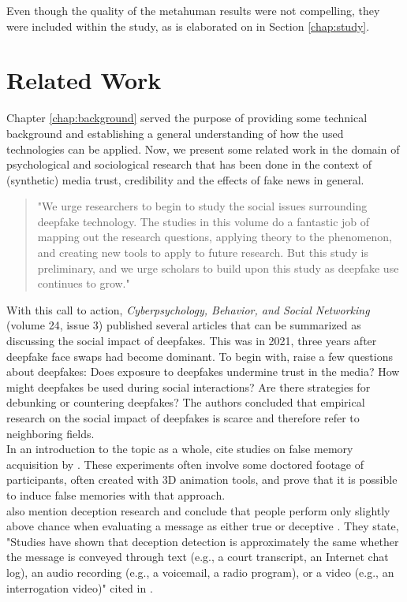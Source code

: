 \documentclass[
  a4paper,  %
  twoside,  %
  bibliography=totoc,
  headsepline,
  cleardoublepage=empty,
  parskip=half,
  draft=false
]{scrbook}
\begin{document}
Even though the quality of the metahuman results were not compelling, they were included  within the study, as is elaborated on in Section \ref{chap:study}. 

\chapter{Related Work}
\label{chap:rel-work}
Chapter \ref{chap:background} served the purpose of providing some technical background and establishing a general understanding of how the used technologies can be applied. Now, we present some related work in the domain of psychological and sociological research that has been done in the context of (synthetic) media trust, credibility and the effects of fake news in general. 

\begin{quotation}
  "We urge researchers to begin to study the social issues surrounding deepfake technology. The studies in this volume do a fantastic job of mapping out the research questions, applying theory to the phenomenon, and creating new tools to apply to future research. But this study is preliminary, and we urge scholars to build upon this study as deepfake use continues to grow." \cite{hancockSocialImpactDeepfakes2021}
\end{quotation}

With this call to action, \textit{Cyberpsychology, Behavior, and Social Networking} (volume 24, issue 3) published several articles that can be summarized as discussing the social impact of deepfakes. This was in 2021, three years after deepfake face swaps had become dominant. To begin with, \citet{hancockSocialImpactDeepfakes2021} raise a few questions about deepfakes: Does exposure to deepfakes undermine trust in the media? How might deepfakes be used during social interactions? Are there strategies for debunking or countering deepfakes? The authors concluded that empirical research on the social impact of deepfakes is scarce and therefore refer to neighboring fields. \\
In an introduction to the topic as a whole, \citet{hancockSocialImpactDeepfakes2021} cite studies on false memory acquisition by \citet{garryActuallyPictureWorth2005}. These experiments often involve some doctored footage of participants, often created with 3D animation tools, and prove that it is possible to induce false memories with that approach. \\
\citet{hancockSocialImpactDeepfakes2021} also mention deception research and conclude that people perform only slightly above chance when evaluating a message as either true or deceptive \cite{bondAccuracyDeceptionJudgments2006}. They state, "Studies have shown that deception detection is approximately the same whether the message is conveyed through text (e.g., a court transcript, an Internet chat log), an audio recording (e.g., a voicemail, a radio program), or a video (e.g., an interrogation video)" \cite{hancockSeeNoEvil2010} cited in \cite{hancockSocialImpactDeepfakes2021}.
\end{document}
